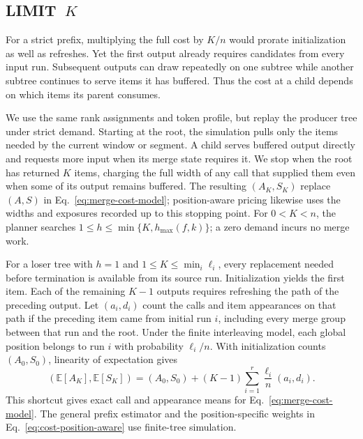 \subsection{\texorpdfstring{\textsf{LIMIT}~$K$}{LIMIT K}}
\label{sec:cost-limit}

For a strict prefix, multiplying the full cost by $K/n$ would prorate initialization as well as refreshes. Yet the first output already requires candidates from every input run. Subsequent outputs can draw repeatedly on one subtree while another subtree continues to serve items it has buffered. Thus the cost at a child depends on which items its parent consumes.

We use the same rank assignments and token profile, but replay the producer tree under strict demand. Starting at the root, the simulation pulls only the items needed by the current window or segment. A child serves buffered output directly and requests more input when its merge state requires it. We stop when the root has returned $K$ items, charging the full width of any call that supplied them even when some of its output remains buffered. The resulting $(A_K,S_K)$ replace $(A,S)$ in Eq.~\eqref{eq:merge-cost-model}; position-aware pricing likewise uses the widths and exposures recorded up to this stopping point. For $0<K<n$, the planner searches $1\leq h\leq\min\{K,h_{\max}(f,k)\}$; a zero demand incurs no merge work.

For a loser tree with $h=1$ and $1\leq K\leq\min_i\ell_i$, every replacement needed before termination is available from its source run. Initialization yields the first item. Each of the remaining $K-1$ outputs requires refreshing the path of the preceding output. Let $(a_i,d_i)$ count the calls and item appearances on that path if the preceding item came from initial run $i$, including every merge group between that run and the root. Under the finite interleaving model, each global position belongs to run $i$ with probability $\ell_i/n$. With initialization counts $(A_0,S_0)$, linearity of expectation gives
\begin{equation}
 (\mathbb E[A_K],\mathbb E[S_K])=(A_0,S_0)
  +(K-1)\sum_{i=1}^{r}\frac{\ell_i}{n}(a_i,d_i).
 \label{eq:cost-limit-single}
\end{equation}
This shortcut gives exact call and appearance means for Eq.~\eqref{eq:merge-cost-model}. The general prefix estimator and the position-specific weights in Eq.~\eqref{eq:cost-position-aware} use finite-tree simulation.
